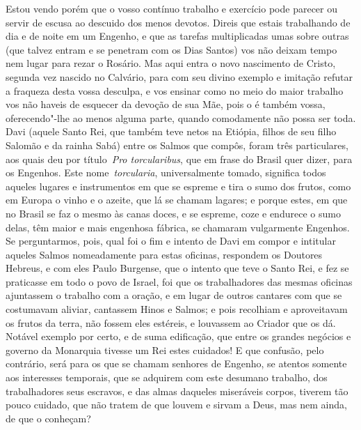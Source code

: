 Estou vendo porém que o vosso contínuo trabalho e exercício
pode parecer ou servir de escusa ao descuido dos menos devotos. Direis
que estais trabalhando de dia e de noite em um Engenho, e que as tarefas
multiplicadas umas sobre outras (que talvez entram e se penetram com os
Dias Santos) vos não deixam tempo nem lugar para rezar o Rosário.
Mas aqui entra o novo nascimento de Cristo, segunda vez nascido no
Calvário, para com seu divino exemplo e imitação refutar a fraqueza
desta vossa desculpa, e vos ensinar como no meio do maior trabalho vos
não haveis de esquecer da devoção de sua Mãe, pois o é também vossa,
oferecendo"-lhe ao menos alguma parte, quando comodamente não possa ser
toda. Davi (aquele Santo Rei, que também teve netos na Etiópia, filhos
de seu filho Salomão e da rainha Sabá) entre os Salmos que compôs, foram
três particulares, aos quais deu por título~\emph{Pro torcularibus}, que
em frase do Brasil quer dizer, para os Engenhos. Este
nome~\emph{torcularia}, universalmente tomado, significa todos aqueles
lugares e instrumentos em que se espreme e tira o sumo dos frutos, como
em Europa o vinho e o azeite, que lá se chamam lagares; e porque estes,
em que no Brasil se faz o mesmo às canas doces, e se espreme, coze e
endurece o sumo delas, têm maior e mais engenhosa fábrica, se chamaram
vulgarmente Engenhos. Se perguntarmos, pois, qual foi o fim e intento de
Davi em compor e intitular aqueles Salmos nomeadamente para estas
oficinas, respondem os Doutores Hebreus, e com eles Paulo Burgense, que
o intento que teve o Santo Rei, e fez se praticasse em todo o povo de
Israel, foi que os trabalhadores das mesmas oficinas ajuntassem o
trabalho com a oração, e em lugar de outros cantares com que se
costumavam aliviar, cantassem Hinos e Salmos; e pois recolhiam e
aproveitavam os frutos da terra, não fossem eles estéreis, e louvassem
ao Criador que os dá. Notável exemplo por certo, e de suma edificação,
que entre os grandes negócios e governo da Monarquia tivesse um Rei
estes cuidados! E que confusão, pelo contrário, será para os que se
chamam senhores de Engenho, se atentos somente aos interesses temporais,
que se adquirem com este desumano trabalho, dos trabalhadores seus
escravos, e das almas daqueles miseráveis corpos, tiverem tão pouco
cuidado, que não tratem de que louvem e sirvam a Deus, mas nem ainda, de
que o conheçam?

